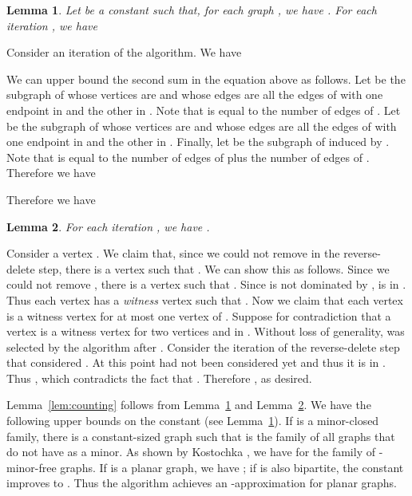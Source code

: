 \documentclass[11pt]{article}
\newtheorem{lemma}{Lemma}[section]
\renewenvironment{proof}{\vspace{-0.1in}\noindent{\bf Proof:}}{\hspace*{\fill}\par}
\begin{document}
\begin{lemma} \label{lem:counting-first}
	Let  be a constant such that, for each graph , we have .  For each
	iteration , we have
		
\end{lemma}
\begin{proof}
	Consider an iteration  of the algorithm.  We have
		
	We can upper bound the second sum in the equation above as
	follows.  Let  be the subgraph of  whose vertices are
	 and whose edges are all the edges of  with one
	endpoint in  and the other in . Note that
	 is equal to
	the number of edges of .  Let  be the subgraph of 
	whose vertices are  and whose edges are all the edges of 
	with one endpoint in  and the other in .
	Finally, let  be the subgraph of 
	induced by . Note that  is equal to the number of edges of
	 plus the number of edges of . Therefore we have
		
	Therefore we have
		
\end{proof}

\begin{lemma} \label{lem:counting-second}
	For each iteration , we have .
\end{lemma}
\begin{proof}
	Consider a vertex . We claim that, since we could not
	remove  in the reverse-delete step, there is a vertex  such that .
	We can show this as follows. Since we could not remove , there
	is a vertex  such that . Since  is not dominated by
	,  is in . Thus each vertex  has a
	\emph{witness} vertex  such that . Now we claim that each vertex  is a witness vertex for at most one vertex of .
	Suppose for contradiction that a vertex  is a witness
	vertex for two vertices  and  in . Without loss of
	generality,  was selected by the algorithm after .
	Consider the iteration of the reverse-delete step that considered
	. At this point  had not been considered yet and thus
	it is in . Thus ,
	which contradicts the fact that . Therefore , as
	desired.
\end{proof}

\medskip\noindent
Lemma~\ref{lem:counting} follows from Lemma~\ref{lem:counting-first}
and Lemma~\ref{lem:counting-second}. We have the following upper
bounds on the constant  (see
Lemma~\ref{lem:counting-first}). If  is a minor-closed family,
there is a constant-sized graph  such that  is the family of
all graphs that do not have  as a minor. As shown by Kostochka
\cite{Kostochka84}, we have  for
the family of -minor-free graphs. If  is a planar graph, we
have ; if  is also bipartite, the constant improves
to . Thus the algorithm achieves an -approximation for planar
graphs.
\end{document}
